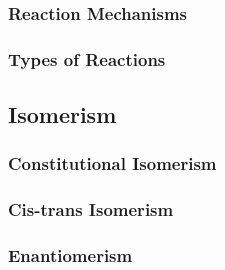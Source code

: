 \documentclass[../main]{subfiles}
\begin{document}
	\subsubsection{Reaction Mechanisms}

	\subsubsection{Types of Reactions}

	\subsection{Isomerism}

	\subsubsection{Constitutional Isomerism}

	\subsubsection{Cis-trans Isomerism}

	\subsubsection{Enantiomerism}
\end{document}
